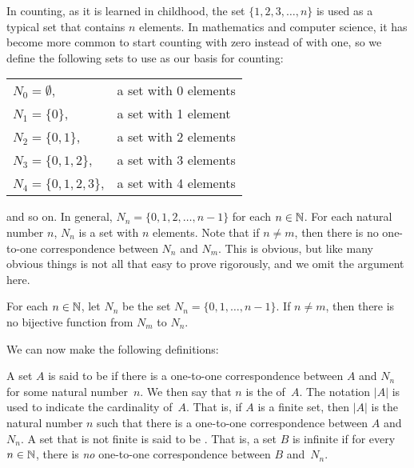 In counting, as it is learned in childhood, the set $\{1,2,3,\dots,n\}$
is used as a typical set that contains $n$ elements.  In mathematics
and computer science, it has become more common to start counting with
zero instead of with one, so we define the following sets to use
as our basis for counting:
\begin{center}
\begin{tabular}{@{\qquad\qquad}ll}
   $N_0=\emptyset$,& a set with 0 elements\\
   $N_1=\{0\}$,& a set with 1 element\\
   $N_2=\{0,1\}$,& a set with 2 elements\\
   $N_3=\{0,1,2\}$,& a set with 3 elements\\
   $N_4=\{0,1,2,3\}$,& a set with 4 elements\\
\end{tabular}
\end{center}
\noindent and so on.  In general, $N_n=\{0,1,2,\dots,n-1\}$ for each $n\in{\mathbb N}$.
For each natural number $n$, $N_n$ is a set with $n$ elements.
Note that if $n\not= m$, then there is no one-to-one correspondence
between $N_n$ and $N_m$.  This is obvious, but like many obvious things
is not all that easy to prove rigorously, and we omit the argument here. 

\begin{theorem}
For each $n\in{\mathbb N}$, let $N_n$ be the set $N_n=\{0,1,\dots,n-1\}$.
If $n\not=m$, then there is no bijective function from $N_m$ to $N_n$.
\end{theorem}


We can now make the following definitions:

\begin{definition}
A set $A$ is said to be  if there is a one-to-one
correspondence between $A$ and $N_n$ for some natural number~$n$.  We then
say that $n$ is the  of~$A$.  The notation $|A|$ is
used to indicate the cardinality of~$A$.  That is, if $A$ is a finite set,
then $|A|$ is the natural number $n$ such that there is a one-to-one
correspondence between $A$ and $N_n$.  A set that is not finite is
said to be .  That is, a set $B$ is infinite
if for every $n\in {\mathbb N}$, there is \emph{no} one-to-one correspondence between
$B$ and~$N_n$.
\end{definition}

